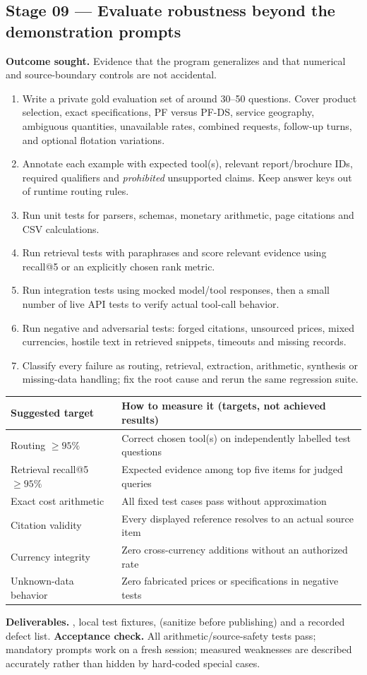 \documentclass[11pt,a4paper]{article}
\DeclareRobustCommand{\code}[1]{{\ttfamily\small\detokenize{#1}}}
\begin{document}
\subsection{Stage 09 --- Evaluate robustness beyond the demonstration prompts}
\textbf{Outcome sought.} Evidence that the program generalizes and that numerical and source-boundary controls are not accidental.
\begin{enumerate}
\item Write a private gold evaluation set of around 30--50 questions. Cover product selection, exact specifications, PF versus PF-DS, service geography, ambiguous quantities, unavailable rates, combined requests, follow-up turns, and optional flotation variations.
\item Annotate each example with expected tool(s), relevant report/brochure IDs, required qualifiers and \emph{prohibited} unsupported claims. Keep answer keys out of runtime routing rules.
\item Run unit tests for parsers, schemas, monetary \code{Decimal} arithmetic, page citations and CSV calculations.
\item Run retrieval tests with paraphrases and score relevant evidence using recall@5 or an explicitly chosen rank metric.
\item Run integration tests using mocked model/tool responses, then a small number of live API tests to verify actual tool-call behavior.
\item Run negative and adversarial tests: forged citations, unsourced prices, mixed currencies, hostile text in retrieved snippets, timeouts and missing records.
\item Classify every failure as routing, retrieval, extraction, arithmetic, synthesis or missing-data handling; fix the root cause and rerun the same regression suite.
\end{enumerate}
\begin{tabularx}{\textwidth}{@{}L{50mm}Y@{}}
\toprule\textbf{Suggested target} & \textbf{How to measure it (targets, not achieved results)}\\\midrule
Routing $\geq95\%$ & Correct chosen tool(s) on independently labelled test questions\\
Retrieval recall@5 $\geq95\%$ & Expected evidence among top five items for judged queries\\
Exact cost arithmetic & All fixed \code{Decimal} test cases pass without approximation\\
Citation validity & Every displayed reference resolves to an actual source item\\
Currency integrity & Zero cross-currency additions without an authorized rate\\
Unknown-data behavior & Zero fabricated prices or specifications in negative tests\\
\bottomrule
\end{tabularx}
\textbf{Deliverables.} \code{tests/}, local test fixtures, \code{docs/evaluation.md} (sanitize before publishing) and a recorded defect list.
\textbf{Acceptance check.} All arithmetic/source-safety tests pass; mandatory prompts work on a fresh session; measured weaknesses are described accurately rather than hidden by hard-coded special cases.
\end{document}
